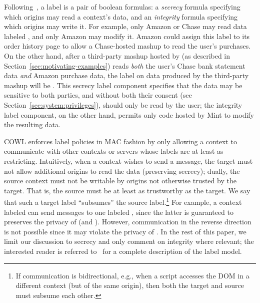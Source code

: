 Following~\cite{yang:2013:towards, stefan:2011:dclabels}, a label is a
pair of boolean formulas: a \emph{secrecy} formula specifying which
origins may read a context's data, and an \emph{integrity} formula
specifying which origins may write it.
%
For example, only Amazon or Chase may read data labeled
, and only Amazon may
modify it.
%
Amazon could assign this label to its order history page to allow a
Chase-hosted mashup to read the user's purchases.
%
On the other hand, after a third-party mashup hosted by
 (as described in
Section~\ref{sec:motivating-examples}) reads {\em both} the user's
Chase bank statement data {\em and} Amazon purchase data, the label on
data produced by the third-party mashup will be
.
%
This secrecy label component specifies that the data may be sensitive
to both parties, and without both their consent (see
Section~\ref{sec:system:privileges}), should only be read by the user;
the integrity label component, on the other hand, permits only code
hosted by Mint to modify the resulting data.
 
COWL enforces label policies in MAC fashion by only allowing a context
to communicate with other contexts or servers whose labels are at
least as restricting.
%
Intuitively, when a context wishes to send a message, the target must
not allow additional origins to read the data (preserving secrecy);
dually, the source context must not be writable by origins not
otherwise trusted by the target. That is, the source must be at least
as trustworthy as the target.
%
We say that such a target label ``subsumes'' the source
label.\footnote{ If communication is bidirectional, e.g., when a
  script accesses the DOM in a different context (but of the same
  origin), then both the target and source must subsume each other.}
%
For example, a context labeled
 can send messages to
one labeled , since the latter is guaranteed
to preserves the privacy of  (and
).
%
However, communication in the reverse direction is not possible since
it may violate the privacy of .
%
In the rest of this paper, we limit our discussion to secrecy and only
comment on integrity where relevant; the interested reader is referred
to~\cite{stefan:2011:dclabels} for a complete description of the label
model.

